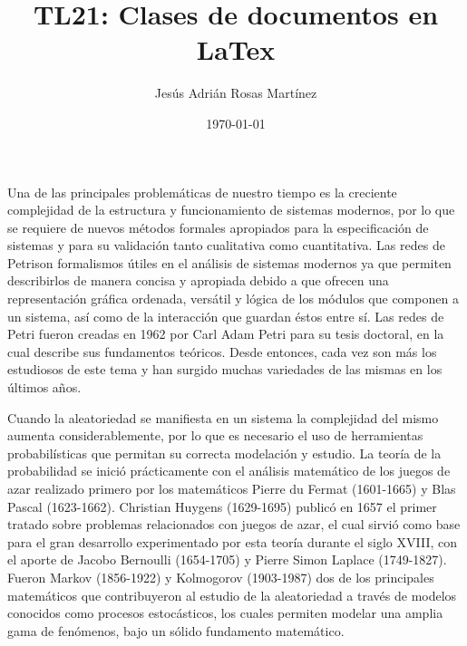 \documentclass[12pt]{report}
\title{TL21: Clases de documentos en LaTex}
\author{Jes\'us Adri\'an Rosas Mart\'inez}
\date{\small{\today}}
\begin{document}
\maketitle %

Una de las principales problemáticas de nuestro tiempo es la creciente complejidad de la estructura y funcionamiento de sistemas modernos, por lo que se requiere de nuevos métodos formales apropiados para la especificación de sistemas y para su validación tanto cualitativa como cuantitativa. Las redes de Petrison formalismos útiles en el análisis de sistemas modernos ya que permiten describirlos de manera concisa y apropiada debido a que ofrecen una representación gráfica ordenada, versátil y lógica de los módulos que componen a un sistema, así como de la interacción que guardan éstos entre sí. Las redes de Petri fueron creadas en 1962 por Carl Adam Petri para su tesis doctoral, en la cual describe sus fundamentos teóricos. Desde entonces, cada vez son más los estudiosos de este tema y han surgido muchas variedades de las mismas en los últimos años.

Cuando la aleatoriedad se manifiesta en un sistema la complejidad del mismo aumenta considerablemente, por lo que es necesario el uso de herramientas probabilísticas que permitan su correcta modelación y estudio. La teoría de la probabilidad se inició prácticamente con el análisis matemático de los juegos de azar realizado primero por los matemáticos Pierre du Fermat (1601-1665) y Blas Pascal (1623-1662). Christian Huygens (1629-1695) publicó en 1657 el primer tratado sobre problemas relacionados con juegos de azar, el cual sirvió como base para el gran desarrollo experimentado por esta teoría durante el siglo XVIII, con el aporte de Jacobo Bernoulli (1654-1705) y Pierre Simon Laplace (1749-1827). Fueron Markov (1856-1922) y Kolmogorov (1903-1987) dos de los principales matemáticos que contribuyeron al estudio de la aleatoriedad a través de modelos conocidos como procesos estocásticos, los cuales permiten modelar una amplia gama de fenómenos, bajo un sólido fundamento matemático.
\end{document}
